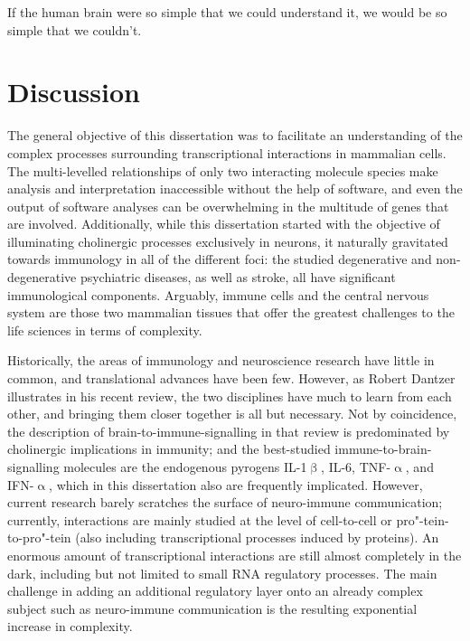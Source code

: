 \newpage\null\pagestyle{plain}\newpage

\pagestyle{fancy}
\fancyhf{}
\renewcommand{\sectionmark}[1]{\markright{#1}} %
\fancyhead[le,ro]{\nouppercase{\rightmark}}
\fancyfoot[le,ro]{\thepage}
\renewcommand{\headrulewidth}{.4pt}
\renewcommand{\footrulewidth}{.4pt}

\begin{savequote}[82mm]
If the human brain were so simple that we could understand it, we would be so simple that we couldn’t.
\end{savequote}

\chapter{Discussion}
The general objective of this dissertation was to facilitate an understanding of the complex processes surrounding transcriptional interactions in mammalian cells. The multi-levelled relationships of only two interacting molecule species make analysis and interpretation inaccessible without the help of software, and even the output of software analyses can be overwhelming in the multitude of genes that are involved. Additionally, while this dissertation started with the objective of illuminating cholinergic processes exclusively in neurons, it naturally gravitated towards immunology in all of the different foci: the studied degenerative and non-degenerative psychiatric diseases, as well as stroke, all have significant immunological components. Arguably, immune cells and the central nervous system are those two mammalian tissues that offer the greatest challenges to the life sciences in terms of complexity. 

Historically, the areas of immunology and neuroscience research have little in common, and translational advances have been few. However, as Robert Dantzer illustrates in his recent review,\cite{Dantzer2018} the two disciplines have much to learn from each other, and bringing them closer together is all but necessary. Not by coincidence, the description of brain-to-immune-signalling in that review is predominated by cholinergic implications in immunity; and the best-studied immune-to-brain-signalling molecules are the endogenous pyrogens IL-1$\upbeta$, IL-6, TNF-$\upalpha$, and IFN-$\upalpha$, which in this dissertation also are frequently implicated. However, current research barely scratches the surface of neuro-immune communication; currently, interactions are mainly studied at the level of cell-to-cell or pro"-tein-to-pro"-tein (also including transcriptional processes induced by proteins). An enormous amount of transcriptional interactions are still almost completely in the dark, including but not limited to small RNA regulatory processes. The main challenge in adding an additional regulatory layer onto an already complex subject such as neuro-immune communication is the resulting exponential increase in complexity.

